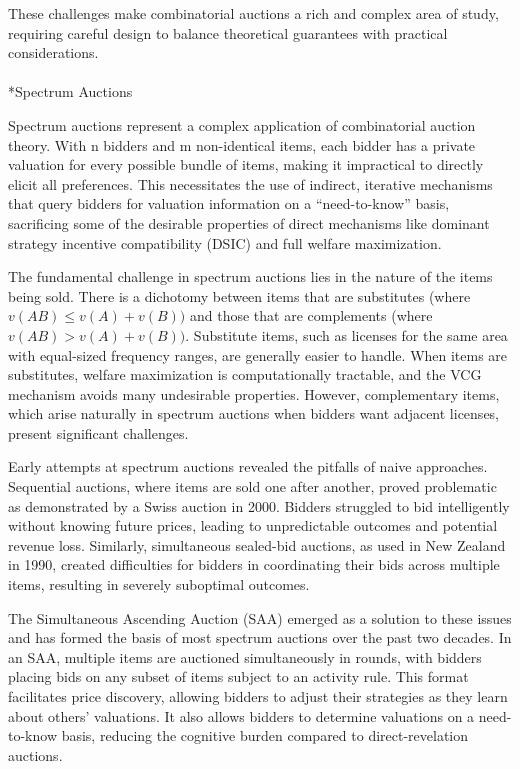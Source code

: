 \documentclass[
  letterpaper,
  numbers=noenddot,
  DIV=11]{scrreprt}
\makeatletter
\let\oldparagraph\paragraph
\renewcommand{\paragraph}{
    \@ifstar
      \xxxParagraphStar
      \xxxParagraphNoStar
  }
\newcommand{\xxxParagraphStar}[1]{\oldparagraph*{#1}\mbox{}}
\newcommand{\xxxParagraphNoStar}[1]{\oldparagraph{#1}\mbox{}}
\theoremstyle{definition}
\theoremstyle{plain}
\theoremstyle{plain}
\theoremstyle{remark}
\makeatother
\begin{document}
These challenges make combinatorial auctions a rich and complex area of
study, requiring careful design to balance theoretical guarantees with
practical considerations.

\paragraph*{Spectrum Auctions}\label{spectrum-auctions}

Spectrum auctions represent a complex application of combinatorial
auction theory. With n bidders and m non-identical items, each bidder
has a private valuation for every possible bundle of items, making it
impractical to directly elicit all preferences. This necessitates the
use of indirect, iterative mechanisms that query bidders for valuation
information on a ``need-to-know'' basis, sacrificing some of the
desirable properties of direct mechanisms like dominant strategy
incentive compatibility (DSIC) and full welfare maximization.

The fundamental challenge in spectrum auctions lies in the nature of the
items being sold. There is a dichotomy between items that are
substitutes (where \(v(AB) \leq v(A) + v(B))\) and those that are
complements (where \(v(AB) > v(A) + v(B))\). Substitute items, such as
licenses for the same area with equal-sized frequency ranges, are
generally easier to handle. When items are substitutes, welfare
maximization is computationally tractable, and the VCG mechanism avoids
many undesirable properties. However, complementary items, which arise
naturally in spectrum auctions when bidders want adjacent licenses,
present significant challenges.

Early attempts at spectrum auctions revealed the pitfalls of naive
approaches. Sequential auctions, where items are sold one after another,
proved problematic as demonstrated by a Swiss auction in 2000. Bidders
struggled to bid intelligently without knowing future prices, leading to
unpredictable outcomes and potential revenue loss. Similarly,
simultaneous sealed-bid auctions, as used in New Zealand in 1990,
created difficulties for bidders in coordinating their bids across
multiple items, resulting in severely suboptimal outcomes.

The Simultaneous Ascending Auction (SAA) emerged as a solution to these
issues and has formed the basis of most spectrum auctions over the past
two decades. In an SAA, multiple items are auctioned simultaneously in
rounds, with bidders placing bids on any subset of items subject to an
activity rule. This format facilitates price discovery, allowing bidders
to adjust their strategies as they learn about others' valuations. It
also allows bidders to determine valuations on a need-to-know basis,
reducing the cognitive burden compared to direct-revelation auctions.
\end{document}
